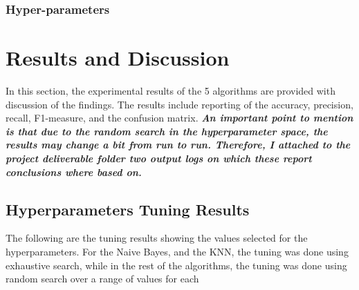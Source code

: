 \documentclass{article}
\begin{document}
\subsubsection*{Hyper-parameters}


\newpage
\section{Results and Discussion}
In this section, the experimental results of the 5 algorithms are provided with discussion of the findings. The results include reporting of the accuracy, precision, recall, F1-measure, and the confusion matrix. \textbf{\textit{An important point to mention is that due to the random search in the hyperparameter space, the results may change a bit from run to run. Therefore, I attached to the project deliverable folder two output logs on which these report conclusions where based on.}}

\subsection{Hyperparameters Tuning Results}
The following are the tuning results showing the values selected for the hyperparameters. For the Naive Bayes, and the KNN, the tuning was done using exhaustive search, while in the rest of the algorithms, the tuning was done using random search over a range of values for each 


\newpage
\end{document}
